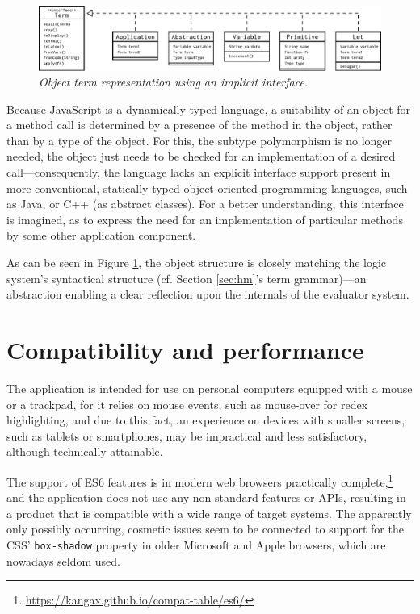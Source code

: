 \documentclass[table, a4paper, 10pt]{book}
\begin{document}
\begin{figure}[H]\centering
\includegraphics[scale=0.64]{termUML.pdf}
\caption{\textit{Object term representation using an implicit interface.}}\label{termuml}
\end{figure}

\noindent
Because JavaScript is a dynamically typed language, a suitability of an object
for a method call
is determined by a presence of the method in the object, rather than by a type of the object.
For this, the subtype polymorphism is no longer needed, the object just needs to be 
checked for an implementation of a desired call---consequently, the language
lacks an explicit interface support present in more conventional,
statically typed object-oriented programming languages, such as
Java, or C++ (as abstract classes). For a better understanding, this interface is imagined, as to
express the need for an implementation of particular methods by some other
application component.

As can be seen in Figure \ref{termuml}, the object structure is closely matching the logic system's
syntactical structure (cf. Section \ref{sec:hm}'s term grammar)---an abstraction enabling
a clear reflection upon the internals of the evaluator system.

\section{Compatibility and performance}
The application is intended for use on personal computers equipped with a mouse
or a trackpad, for it relies on mouse events, such as mouse-over for redex highlighting,
and due to this fact, an experience on devices with smaller
screens, such as tablets or smartphones,
may be impractical and less satisfactory, although technically attainable.

The support of ES6 features is in modern web browsers practically complete,\footnote{\url{https://kangax.github.io/compat-table/es6/}}
and the application
does not use any non-standard features or APIs,
resulting in a product that is compatible with a wide range of target systems.
The apparently only possibly occurring, cosmetic issues seem to be connected to
support for the CSS' \texttt{box-shadow} property in older Microsoft and Apple browsers,
which are nowadays seldom used.
\end{document}
